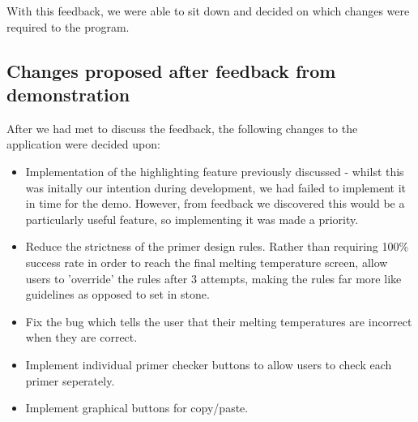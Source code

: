 With this feedback, we were able to sit down and decided on which changes were required to the program.

\subsection{Changes proposed after feedback from demonstration} 

After we had met to discuss the feedback, the following changes to the application were decided upon:

\begin{itemize}

\item Implementation of the highlighting feature previously discussed - whilst this was initally our intention during development, we had failed to implement it in time for the demo. However, from feedback we discovered this would be a particularly useful feature, so implementing it was made a priority.
\item Reduce the strictness of the primer design rules. Rather than requiring 100\% success rate in order to reach the final melting temperature screen, allow users to 'override' the rules after 3 attempts, making the rules far more like guidelines as opposed to set in stone.
\item Fix the bug which tells the user that their melting temperatures are incorrect when they are correct.
\item Implement individual primer checker buttons to allow users to check each primer seperately.
\item Implement graphical buttons for copy/paste.

\end{itemize}
